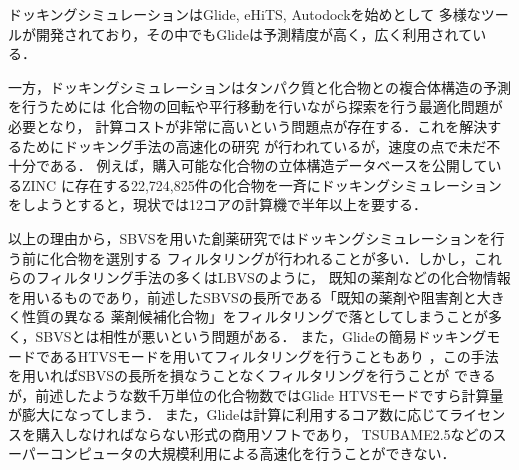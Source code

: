 ドッキングシミュレーションはGlide\cite{Friesner2004}, eHiTS\cite{Zsoldos2007}, Autodock\cite{Morris2009}を始めとして
多様なツールが開発されており，その中でもGlideは予測精度が高く\cite{Kruger2010}，広く利用されている\cite{Yuriev2013}．

一方，ドッキングシミュレーションはタンパク質と化合物との複合体構造の予測を行うためには
化合物の回転や平行移動を行いながら探索を行う最適化問題が必要となり，
計算コストが非常に高いという問題点が存在する．これを解決するためにドッキング手法の高速化の研究\cite{Kannan2010, McIntosh-Smith2014, Trott2010}
が行われているが，速度の点で未だ不十分である．
例えば，購入可能な化合物の立体構造データベースを公開しているZINC
\cite{Irwin2005}に存在する22,724,825件の化合物を一斉にドッキングシミュレーションをしようとすると，現状では12コアの計算機で半年以上を要する．

%

以上の理由から，SBVSを用いた創薬研究ではドッキングシミュレーションを行う前に化合物を選別する
フィルタリングが行われることが多い\cite{Nilakantan1993, Parenti2003}．しかし，これらのフィルタリング手法の多くはLBVSのように，
既知の薬剤などの化合物情報を用いるものであり，前述したSBVSの長所である「既知の薬剤や阻害剤と大きく性質の異なる
薬剤候補化合物」をフィルタリングで落としてしまうことが多く，SBVSとは相性が悪いという問題がある．
また，Glideの簡易ドッキングモードであるHTVSモードを用いてフィルタリングを行うこともあり
\cite{Fujimoto2008}，この手法を用いればSBVSの長所を損なうことなくフィルタリングを行うことが
できるが，前述したような数千万単位の化合物数ではGlide HTVSモードですら計算量が膨大になってしまう．
また，Glideは計算に利用するコア数に応じてライセンスを購入しなければならない形式の商用ソフトであり，
TSUBAME2.5などのスーパーコンピュータの大規模利用による高速化を行うことができない．

